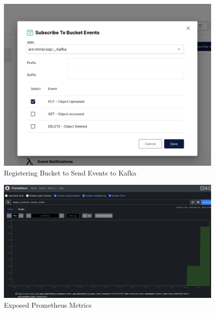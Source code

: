 \documentclass[12pt, conference, final, a4paper, onecolumn, compsoc]{IEEEtran}
\begin{document}
\begin{figure}[H]
  \centering \includegraphics[scale=0.31]{images/minio-bucket-event.png}
  \caption{Registering Bucket to Send Events to Kafka}
  \label{appendix:minio-bucket-event}
\end{figure}



\begin{figure}[H]
  \centering \includegraphics[scale=0.31]{images/prometheus-metrics.png}
  \caption{Exposed Prometheus Metrics}
  \label{appendix:prometheus-metrics}
\end{figure}






\bigskip


 
\end{document}

